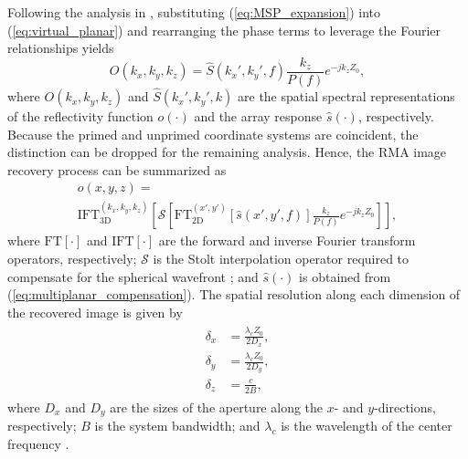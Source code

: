 \documentclass{ieeeaccess}
\begin{document}
Following the analysis in \cite{smith2022ThzToolbox,yanik2020development}, substituting (\ref{eq:MSP_expansion}) into (\ref{eq:virtual_planar}) and rearranging the phase terms to leverage the Fourier relationships yields
\begin{equation}
    O(k_x,k_y,k_z) = \hat{S}(k_x',k_y',f) \frac{k_z}{P(f)} e^{-j k_z Z_0},
\end{equation}
where $O(k_x,k_y,k_z)$ and $\hat{S}(k_x',k_y',k)$ are the spatial spectral representations of the reflectivity function $o(\cdot)$ and the array response $\hat{s}(\cdot)$, respectively.
Because the primed and unprimed coordinate systems are coincident, the distinction can be dropped for the remaining analysis.
Hence, the RMA image recovery process can be summarized as
\begin{multline}
\label{eq:RMA_final}
    o(x,y,z) = \\
    \text{IFT}_{\text{3D}}^{(k_x,k_y,k_z)}\left[ \mathcal{S} \left[ \text{FT}_{\text{2D}}^{(x',y')} \left[ \hat{s}(x',y',f) \right] \frac{k_z}{P(f)} e^{-j k_z Z_0} \right] \right],
\end{multline}
where $\text{FT}[\cdot]$ and $\text{IFT}[\cdot]$ are the forward and inverse Fourier transform operators, respectively; $\mathcal{S}$ is the Stolt interpolation operator required to compensate for the spherical wavefront \cite{smith2022ThzToolbox}; and $\hat{s}(\cdot)$ is obtained from (\ref{eq:multiplanar_compensation}).
The spatial resolution along each dimension of the recovered image is given by
\begin{align}
\label{eq:spatial_resolution}
\begin{split}
    \delta_x &= \frac{\lambda_c Z_0}{2 D_x}, \\
    \delta_y &= \frac{\lambda_c Z_0}{2 D_y}, \\
    \delta_z &= \frac{c}{2B},
\end{split}
\end{align}
where $D_x$ and $D_y$ are the sizes of the aperture along the $x$- and $y$-directions, respectively; $B$ is the system bandwidth; and $\lambda_c$ is the wavelength of the center frequency \cite{smith2022ThzToolbox,yanik2019sparse,gao2018_1D_MIMO}.
\end{document}
